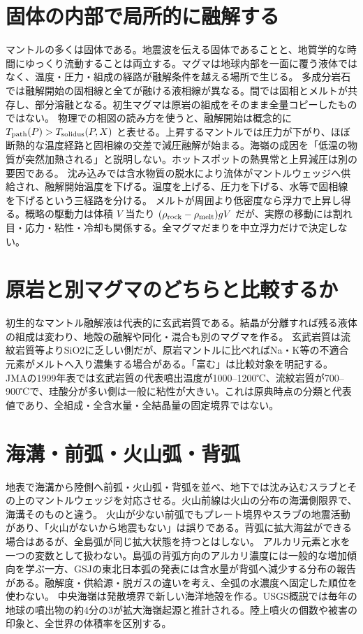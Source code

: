 \section{固体の内部で局所的に融解する}\label{theory:volcano:melting}
マントルの多くは固体である。地震波を伝える固体であることと、地質学的な時間にゆっくり流動することは両立する。マグマは地球内部を一面に覆う液体ではなく、温度・圧力・組成の経路が融解条件を越える場所で生じる。
多成分岩石では融解開始の固相線と全てが融ける液相線が異なる。間では固相とメルトが共存し、部分溶融となる。初生マグマは原岩の組成をそのまま全量コピーしたものではない\cite{vol50_melt_ref}。
物理での相図の読み方を使うと、融解開始は概念的に \(T_{\rm path}(P)>T_{\rm solidus}(P,X)\) と表せる。上昇するマントルでは圧力が下がり、ほぼ断熱的な温度経路と固相線の交差で減圧融解が始まる。海嶺の成因を「低温の物質が突然加熱される」と説明しない。ホットスポットの熱異常と上昇減圧は別の要因である。
沈み込みでは含水物質の脱水により流体がマントルウェッジへ供給され、融解開始温度を下げる\cite{vol50_subduction_ref}。温度を上げる、圧力を下げる、水等で固相線を下げるという三経路を分ける。
メルトが周囲より低密度なら浮力で上昇し得る。概略の駆動力は体積 \(V\) 当たり \((\rho_{\rm rock}-\rho_{\rm melt})gV\) だが、実際の移動には割れ目・応力・粘性・冷却も関係する。全マグマだまりを中立浮力だけで決定しない。

\section{原岩と別マグマのどちらと比較するか}
初生的なマントル融解液は代表的に玄武岩質である。結晶が分離すれば残る液体の組成は変わり、地殻の融解や同化・混合も別のマグマを作る\cite{vol50_melt_ref}。
玄武岩質は流紋岩質等よりSiO2に乏しい側だが、原岩マントルに比べればNa・K等の不適合元素がメルトへ入り濃集する場合がある。「富む」は比較対象を明記する。
JMAの1999年表では玄武岩質の代表噴出温度が1000--1200℃、流紋岩質が700--900℃で、珪酸分が多い側は一般に粘性が大きい\cite{jma_magma1999}。これは原典時点の分類と代表値であり、全組成・全含水量・全結晶量の固定境界ではない。

\section{海溝・前弧・火山弧・背弧}\label{theory:volcano:arc}
地表で海溝から陸側へ前弧・火山弧・背弧を並べ、地下では沈み込むスラブとその上のマントルウェッジを対応させる。火山前線は火山の分布の海溝側限界で、海溝そのものと違う\cite{usgs_plate_boundaries}。
火山が少ない前弧でもプレート境界やスラブの地震活動があり、「火山がないから地震もない」は誤りである。背弧に拡大海盆ができる場合はあるが、全島弧が同じ拡大状態を持つとはしない。
アルカリ元素と水を一つの変数として扱わない。島弧の背弧方向のアルカリ濃度には一般的な増加傾向を学ぶ一方、GSJの東北日本弧の発表には含水量が背弧へ減少する分布の報告がある\cite{vol50_arcwater_ref}。融解度・供給源・脱ガスの違いを考え、全弧の水濃度へ固定した順位を使わない。
中央海嶺は発散境界で新しい海洋地殻を作る。USGS概説では毎年の地球の噴出物の約4分の3が拡大海嶺起源と推計される\cite{vol50_ridge_ref}。陸上噴火の個数や被害の印象と、全世界の体積率を区別する。

